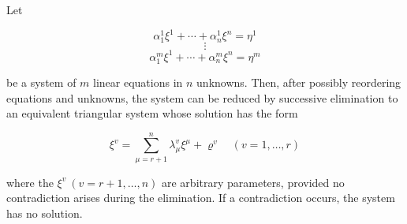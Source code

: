 Let

$$\alpha_1^1 \xi^1 + \cdots + \alpha_n^1 \xi^n = \eta^1$$
$$\vdots$$
$$\alpha_1^m \xi^1 + \cdots + \alpha_n^m \xi^n = \eta^m$$

be a system of $m$ linear equations in $n$ unknowns. Then, after possibly reordering equations and unknowns, the system can be reduced by successive elimination to an equivalent triangular system whose solution has the form

$$\xi^v = \sum_{\mu=r+1}^{n} \lambda_\mu^v \xi^\mu + \varrho^v \quad (v = 1, \dots, r)$$

where the $\xi^v\ (v = r+1, \dots, n)$ are arbitrary parameters, provided no contradiction arises during the elimination. If a contradiction occurs, the system has no solution.
